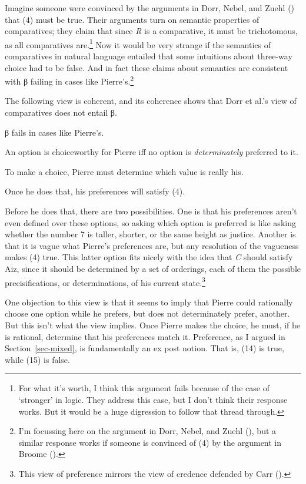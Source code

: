 \documentclass[
  10.5pt,
  twoside]{article}
\providecommand{\tightlist}{%
  \setlength{\itemsep}{0pt}\setlength{\parskip}{0pt}}
\let\olditemize\itemize
\let\endolditemize\enditemize
\renewenvironment{itemize}
  {\vskip 5pt\olditemize}
  {\endolditemize\vskip 5pt}
\begin{document}
Imagine someone were convinced by the arguments in Dorr, Nebel, and
Zuehl () that (4) must be true. Their
arguments turn on semantic properties of comparatives; they claim that
since \emph{R} is a comparative, it must be trichotomous, as all
comparatives are.\footnote{For what it's worth, I think this argument
  fails because of the case of `stronger' in logic. They address this
  case, but I don't think their response works. But it would be a huge
  digression to follow that thread through.} Now it would be very
strange if the semantics of comparatives in natural language entailed
that some intuitions about three-way choice had to be false. And in fact
these claims about semantics are consistent with β failing in cases like
Pierre's.\footnote{I'm focussing here on the argument in Dorr, Nebel,
  and Zuehl (), but a similar response
  works if someone is convinced of (4) by the argument in Broome
  ().}

The following view is coherent, and its coherence shows that Dorr et
al.'s view of comparatives does not entail β.

\begin{itemize}
\tightlist
\item
  β fails in cases like Pierre's.
\item
  An option is choiceworthy for Pierre iff no option is
  \emph{determinately} preferred to it.
\item
  To make a choice, Pierre must determine which value is really his.
\item
  Once he does that, his preferences will satisfy (4).
\item
  Before he does that, there are two possibilities. One is that his
  preferences aren't even defined over these options, so asking which
  option is preferred is like asking whether the number 7 is taller,
  shorter, or the same height as justice. Another is that it is vague
  what Pierre's preferences are, but any resolution of the vagueness
  makes (4) true. This latter option fits nicely with the idea that
  \emph{C} should satisfy Aiz, since it should be determined by a set of
  orderings, each of them the possible precisifications, or
  determinations, of his current state.\footnote{This view of preference
    mirrors the view of credence defended by Carr
    ().}
\end{itemize}

One objection to this view is that it seems to imply that Pierre could
rationally choose one option while he prefers, but does not
determinately prefer, another. But this isn't what the view implies.
Once Pierre makes the choice, he must, if he is rational, determine that
his preferences match it. Preference, as I argued in
Section~\ref{sec-mixed}, is fundamentally an ex post notion. That is,
(14) is true, while (15) is false.
\end{document}
